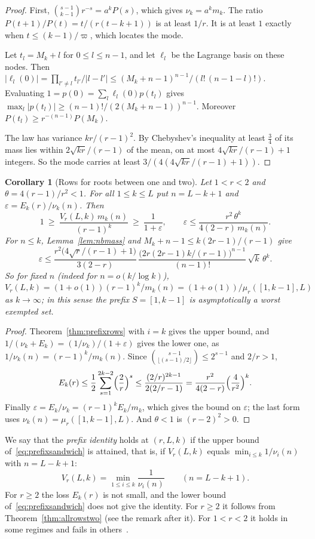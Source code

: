 \documentclass[11pt]{article}
\newtheorem{corollary}[theorem]{Corollary}
\begin{document}
\begin{proof}
First, $\binom{s-1}{k-1}r^{-s}=a^kP(s)$, which gives $\nu_k=a^km_k$.  The
ratio $P(t+1)/P(t)=t/(r(t-k+1))$ is at least $1/r$.  It is at least $1$
exactly when $t\le(k-1)/\varpi$, which locates the mode.

Let $t_l=M_k+l$ for $0\le l\le n-1$, and let $\ell_l$ be the Lagrange basis
on these nodes.  Then
$|\ell_l(0)|=\prod_{l'\ne l}t_{l'}/|l-l'|\le(M_k+n-1)^{n-1}/(l!\,(n-1-l)!)$.
Evaluating $1=p(0)=\sum_l\ell_l(0)p(t_l)$ gives
$\max_l|p(t_l)|\ge(n-1)!/(2(M_k+n-1))^{n-1}$.  Moreover
$P(t_l)\ge r^{-(n-1)}P(M_k)$.

The law has variance $kr/(r-1)^2$.  By Chebyshev's inequality at
least $\frac34$ of its mass lies within $2\sqrt{kr}/(r-1)$ of the mean, on at most
$4\sqrt{kr}/(r-1)+1$ integers.  So the mode carries at least $3/(4(4\sqrt{kr}/(r-1)+1))$.
\end{proof}

\begin{corollary}[Rows for roots between one and two]\label{cor:belowtwo}
Let $1<r<2$ and $\theta=4(r-1)/r^2<1$.  For all $1\le k\le L$ put
$n=L-k+1$ and $\varepsilon=E_k(r)/\nu_k(n)$.  Then
\[
  1\ \ge\ \frac{V_r(L,k)\,m_k(n)}{(r-1)^k}\ \ge\
  \frac1{1+\varepsilon},\qquad
  \varepsilon\le\frac{r^2\,\theta^k}{4(2-r)\,m_k(n)} .
\]
For $n\le k$, Lemma~\ref{lem:nbmass} and $M_k+n-1\le k(2r-1)/(r-1)$ give
\[
  \varepsilon\le\frac{r^2\bigl(4\sqrt r/(r-1)+1\bigr)}{3(2-r)}\,
  \frac{\bigl(2r(2r-1)k/(r-1)\bigr)^{n-1}}{(n-1)!}\,\sqrt k\,\theta^k .
\]
So for fixed $n$ (indeed for $n=o(k/\log k)$),
$V_r(L,k)=(1+o(1))(r-1)^k/m_k(n)=(1+o(1))/\mu_r([1,k-1],L)$ as
$k\to\infty$; in this sense the prefix $S=[1,k-1]$ is asymptotically a
worst exempted set.
\end{corollary}

\begin{proof}
Theorem~\ref{thm:prefixrows} with $i=k$ gives the upper bound, and
$1/(\nu_k+E_k)=(1/\nu_k)/(1+\varepsilon)$ gives the lower one, as
$1/\nu_k(n)=(r-1)^k/m_k(n)$.  Since
$\binom{s-1}{\lfloor(s-1)/2\rfloor}\le2^{s-1}$ and $2/r>1$,
\[
  E_k(r)\le\frac12\sum_{s=1}^{2k-2}\Bigl(\frac2r\Bigr)^s\le
  \frac{(2/r)^{2k-1}}{2(2/r-1)}=\frac{r^2}{4(2-r)}\Bigl(\frac4{r^2}\Bigr)^k .
\]
Finally $\varepsilon=E_k/\nu_k=(r-1)^kE_k/m_k$, which gives the bound on
$\varepsilon$; the last form uses $\nu_k(n)=\mu_r([1,k-1],L)$.  And
$\theta<1$ is $(r-2)^2>0$.
\end{proof}

We say that the \emph{prefix identity} holds at $(r,L,k)$ if the upper
bound of~\eqref{eq:prefixsandwich} is attained, that is, if
$V_r(L,k)$ equals $\min_{i\le k}1/\nu_i(n)$ with $n=L-k+1$:
\begin{equation}\label{eq:prefixid}
  V_r(L,k)=\min_{1\le i\le k}\frac1{\nu_i(n)}\qquad(n=L-k+1).
\end{equation}
For $r\ge2$ the loss $E_k(r)$ is not small, and the lower bound
of~\eqref{eq:prefixsandwich} does not give the identity.
For $r\ge2$ it follows from Theorem~\ref{thm:allrowstwo} (see the remark
after it).  For $1<r<2$ it holds in some regimes and fails in
others~\cite{coefficient-mass-belowtwo}.
\end{document}
